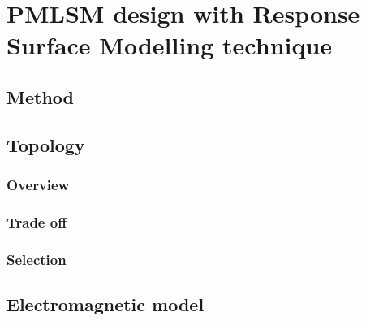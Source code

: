 \chapter{PMLSM design with Response Surface Modelling technique}   \label{Chapter:PMLSM design RSM}


\section{Method}                                \label{Chapter:PMLSM design RSM/method}


\section{Topology}                              \label{Chapter:PMLSM design RSM/topology}
    \subsection{Overview}                       \label{Chapter:PMLSM design RSM/topology/overview}
    \subsection{Trade off}                      \label{Chapter:PMLSM design RSM/topology/trade off}
    \subsection{Selection}                      \label{Chapter:PMLSM design RSM/topology/selection}


\section{Electromagnetic model}                 \label{Chapter:PMLSM design RSM/electromagnetic model}
